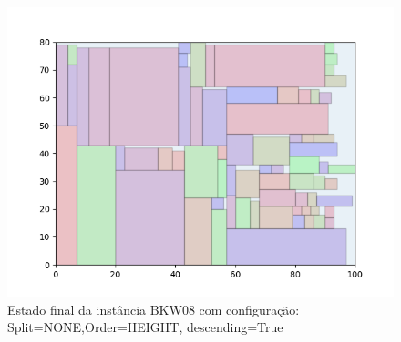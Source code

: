 \begin{figure}[H]
    \centering
    \caption[]{Estado final da instância BKW08 com configuração: Split=NONE,Order=HEIGHT, descending=True}
    \label{fig:bkw08-none-height-true}
    \includegraphics[scale=0.5]{output/figures/bkw/bkw08/none/height/true/00}
\end{figure}